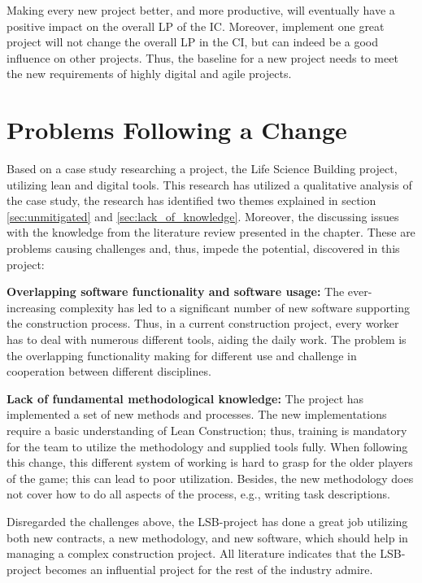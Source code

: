 Making every new project better, and more productive, will eventually have a positive impact on the overall LP of the IC. Moreover, implement one great project will not change the overall LP in the CI, but can indeed be a good influence on other projects. Thus, the baseline for a new project needs to meet the new requirements of highly digital and agile projects.

\section{Problems Following a Change} \label{sec:rq2}
Based on a case study researching a project, the Life Science Building project, utilizing lean and digital tools. This research has utilized a qualitative analysis of the case study, the research has identified two themes explained in section \ref{sec:unmitigated} and \ref{sec:lack_of_knowledge}. Moreover, the discussing issues with the knowledge from the literature review presented in the  chapter. These are problems causing challenges and, thus, impede the potential, discovered in this project:
    
{\bf Overlapping software functionality and software usage:} The ever-increasing complexity has led to a significant number of new software supporting the construction process. Thus, in a current construction project, every worker has to deal with numerous different tools, aiding the daily work. The problem is the overlapping functionality making for different use and challenge in cooperation between different disciplines.
    
{\bf Lack of fundamental methodological knowledge:} The project has implemented a set of new methods and processes. The new implementations require a basic understanding of Lean Construction; thus, training is mandatory for the team to utilize the methodology and supplied tools fully. When following this change, this different system of working is hard to grasp for the older players of the game; this can lead to poor utilization. Besides, the new methodology does not cover how to do all aspects of the process, e.g., writing task descriptions.

Disregarded the challenges above, the LSB-project has done a great job utilizing both new contracts, a new methodology, and new software, which should help in managing a complex construction project. All literature indicates that the LSB-project becomes an influential project for the rest of the industry admire. 

